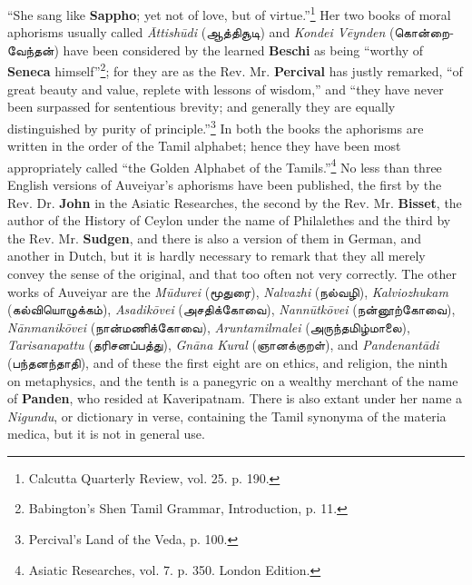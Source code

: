 \documentclass{article}
\newcommand{\TamilText}[1]{\texttamil{#1}}
\newcommand{\tam}[1]{\TamilText{#1}}
\begin{document}
``She sang like \textbf{Sappho}; yet not of love, but of virtue.''\footnote{Calcutta Quarterly Review, vol. 25. p. 190.} Her two books of moral aphorisms usually called \emph{\={A}ttish\={u}di} (\tam{ஆத்திசூடி}) and \emph{Kondei V\={e}ynden} (\tam{கொன்றைவேந்தன்}) have been considered by the learned \textbf{Beschi} as being ``worthy of \textbf{Seneca} himself''\footnote{Babington's Shen Tamil Grammar, Introduction, p. 11.}; for they are as the Rev. Mr. \textbf{Percival} has justly remarked, ``of great beauty and value, replete with lessons of wisdom,'' and ``they have never been surpassed for sententious brevity; and generally they are equally distinguished by purity of principle.''\footnote{Percival's Land of the Veda, p. 100.} In both the books the aphorisms are written in the order of the Tamil alphabet; hence they have been most appropriately called ``the Golden Alphabet of the Tamils.''\footnote{Asiatic Researches, vol. 7. p. 350. London Edition.} No less than three English versions of Auveiyar's aphorisms have been published, the first by the Rev. Dr. \textbf{John} in the Asiatic Researches, the second by the Rev. Mr. \textbf{Bisset}, the author of the History of Ceylon under the name of Philalethes and the third by the Rev. Mr. \textbf{Sudgen}, and there is also a version of them in German, and another in Dutch, but it is hardly necessary to remark that they all merely convey the sense of the original, and that too often not very correctly. The other works of Auveiyar are the \emph{M\={u}durei} (\tam{மூதுரை}), \emph{Nalvazhi} (\tam{நல்வழி}), \emph{Kalviozhukam} (\tam{கல்வியொழுக்கம்}), \emph{Asadik\={o}vei} (\tam{அசதிக்கோவை}), \emph{Nann\={u}tk\={o}vei} (\tam{நன்னூற்கோவை}), \emph{N\={a}nmanik\={o}vei} (\tam{நான்மணிக்கோவை}), \emph{Aruntamilmalei} (\tam{அருந்தமிழ்மாலை}), \emph{Tarisanapattu} (\tam{தரிசனப்பத்து}), \emph{Gn\={a}na Kural} (\tam{ஞானக்குறள்}), and \emph{Pandenant\={a}di} (\tam{பந்தனந்தாதி}), and of these the first eight are on ethics, and religion, the ninth on metaphysics, and the tenth is a panegyric on a wealthy merchant of the name of \textbf{Panden}, who resided at Kaveripatnam. There is also extant under her name a \emph{Nigundu}, or dictionary in verse, containing the Tamil synonyma of the materia medica, but it is not in general use.
\end{document}
